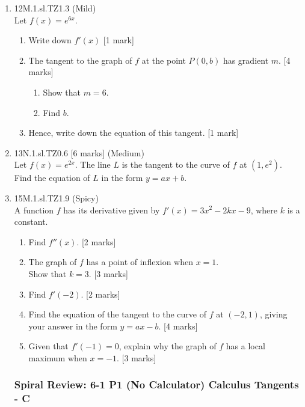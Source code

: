 \documentclass[12pt, twoside]{article}
\begin{document}
\begin{enumerate}
  \item 12M.1.sl.TZ1.3 (Mild)\\
  Let $f(x)=e^{6x}$.
  \begin{enumerate}
    \item Write down $f'(x)$ [1 mark]
    \item The tangent to the graph of $f$ at the point $P(0,b)$ has gradient $m$.  [4 marks]
    \begin{enumerate}
      \item Show that $m=6$.
      \item Find $b$.
    \end{enumerate}
    \item Hence, write down the equation of this tangent. [1 mark]
  \end{enumerate}

\vspace{2cm}
  \item 13N.1.sl.TZ0.6 [6 marks] (Medium)\\
  Let $f(x)=e^{2x}$. The line $L$ is the tangent to the curve of $f$ at $(1,e^2)$.\\
  Find the equation of $L$ in the form $y=ax+b$.

\vspace{2cm}
  \item 15M.1.sl.TZ1.9 (Spicy)\\
  A function $f$ has its derivative given by $f'(x)=3x^2-2kx-9$, where $k$ is a constant.
  \begin{enumerate}
    \item Find $f''(x)$. [2 marks]
    \item The graph of $f$ has a point of inflexion when $x=1$.\\
    Show that $k=3$. [3 marks]
    \item Find $f'(-2)$. [2 marks]
    \item Find the equation of the tangent to the curve of $f$ at $(-2,1)$, giving your answer in the form  $y=ax-b$. [4 marks]
    \item Given that $f'(-1)=0$, explain why the graph of $f$ has a local maximum when $x=-1$. [3 marks]
  \end{enumerate}


\newpage
\setcounter{enumi}{0}
\subsubsection*{Spiral Review: 6-1 P1 (No Calculator) Calculus Tangents - C}



\end{enumerate}
\end{document}
